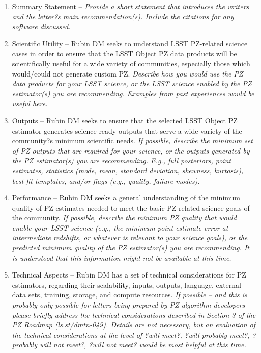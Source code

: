 \documentclass[DM,authoryear,toc]{lsstdoc}
\begin{document}
\begin{enumerate}
\item Summary Statement -- 
\textit{Provide a short statement that introduces the writers and the letter?s main recommendation(s).
Include the citations for any software discussed.
}
\item Scientific Utility -- 
Rubin DM seeks to understand LSST PZ-related science cases in order to ensure that the LSST Object PZ data products will be scientifically useful for a wide variety of communities, especially those which would/could not generate custom PZ. 
\textit{Describe how you would use the PZ data products for your LSST science, or the LSST science enabled by the PZ estimator(s) you are recommending.
Examples from past experiences would be useful here.
}
\item Outputs -- 
Rubin DM seeks to ensure that the selected LSST Object PZ estimator generates science-ready outputs that serve a wide variety of the community?s minimum scientific needs. 
\textit{If possible, describe the minimum set of PZ outputs that are required for your science, or the outputs generated by the PZ estimator(s) you are recommending.
E.g., full posteriors, point estimates, statistics (mode, mean, standard deviation, skewness, kurtosis), best-fit templates, and/or flags (e.g., quality, failure modes).
}
\item Performance -- 
Rubin DM seeks a general understanding of the minimum quality of PZ estimates needed to meet the basic PZ-related science goals of the community.
\textit{If possible, describe the minimum PZ quality that would enable your LSST science (e.g., the minimum point-estimate error at intermediate redshifts, or whatever is relevant to your science goals), or the predicted minimum quality of the PZ estimator(s) you are recommending.
It is understood that this information might not be available at this time.
}
\item Technical Aspects -- 
Rubin DM has a set of technical considerations for PZ estimators, regarding their scalability, inputs, outputs, language, external data sets, training, storage, and compute resources.
\textit{If possible -- and this is probably only possible for letters being prepared by PZ algorithm developers -- please briefly address the technical considerations described in Section 3 of the PZ Roadmap (ls.st/dmtn-049).
Details are not necessary, but an evaluation of the technical considerations at the level of ?will meet?, ?will probably meet?, ?probably will not meet?, ?will not meet? would be most helpful at this time.
}


\end{enumerate}
\end{document}
